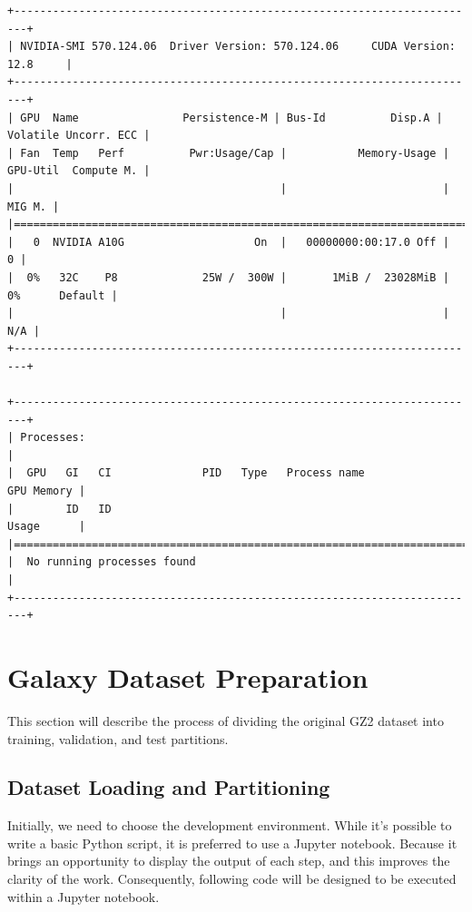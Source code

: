 \begin{lstlisting}[style=mypython, caption={nvidia-smi command output}, label={lst:gpu}]
+------------------------------------------------------------------------+
| NVIDIA-SMI 570.124.06  Driver Version: 570.124.06     CUDA Version: 12.8     |
+------------------------------------------------------------------------+
| GPU  Name                Persistence-M | Bus-Id          Disp.A | Volatile Uncorr. ECC |
| Fan  Temp   Perf          Pwr:Usage/Cap |           Memory-Usage | GPU-Util  Compute M. |
|                                         |                        |               MIG M. |
|========================================================================|
|   0  NVIDIA A10G                    On  |   00000000:00:17.0 Off |                    0 |
|  0%   32C    P8             25W /  300W |       1MiB /  23028MiB |      0%      Default |
|                                         |                        |                  N/A |
+------------------------------------------------------------------------+
                                                                                         
+------------------------------------------------------------------------+
| Processes:                                                                              |
|  GPU   GI   CI              PID   Type   Process name                        GPU Memory |
|        ID   ID                                                               Usage      |
|========================================================================|
|  No running processes found                                                             |
+------------------------------------------------------------------------+
\end{lstlisting}

\section{Galaxy Dataset Preparation}
\label{sec:05-dataset}

This section will describe the process of dividing the original GZ2 dataset into training, validation, and test partitions. 

\subsection*{Dataset Loading and Partitioning}

Initially, we need to choose the development environment. While it's possible to write a basic Python script, it is preferred to use a Jupyter notebook. Because it brings an opportunity to display the output of each step, and this improves the clarity of the work. Consequently, following code will be designed to be executed within a Jupyter notebook.

